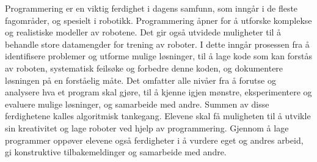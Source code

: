 Programmering er en viktig ferdighet i dagens samfunn, som inngår i de fleste fagområder, og spesielt i robotikk.
Programmering åpner for å utforske komplekse og realistiske modeller av robotene.
Det gir også utvidede muligheter til å behandle store datamengder for trening av roboter.
I dette inngår prosessen fra å identifisere problemer og utforme mulige løsninger, til å lage kode som kan forstås av roboten, systematisk feilsøke og forbedre denne koden, og dokumentere løsningen på en forståelig måte.
Det omfatter alle nivåer fra å forutse og analysere hva et program skal gjøre, til å kjenne igjen mønstre, eksperimentere og evaluere mulige løsninger, og samarbeide med andre.
Summen av disse ferdighetene kalles algoritmisk tankegang.
Elevene skal få muligheten til å utvikle sin kreativitet og lage roboter ved hjelp av programmering.
Gjennom å lage programmer oppøver elevene også ferdigheter i å vurdere eget og andres arbeid, gi konstruktive tilbakemeldinger og samarbeide med andre.

\fi
